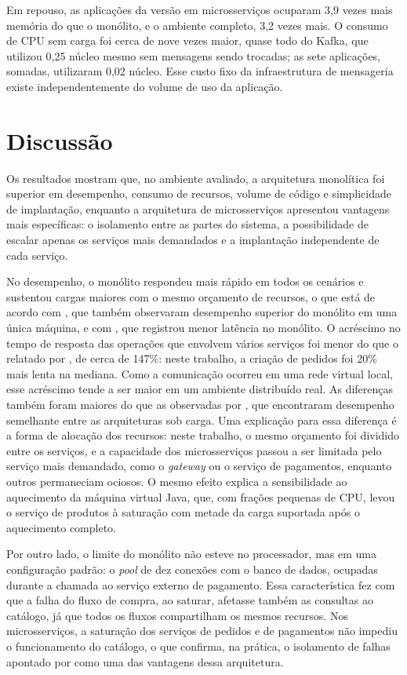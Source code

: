 Em repouso, as aplicações da versão em microsserviços ocuparam 3,9 vezes mais memória do que o
monólito, e o ambiente completo, 3,2 vezes mais. O consumo de CPU sem carga foi cerca de nove
vezes maior,
quase todo do Kafka, que utilizou 0,25 núcleo mesmo sem mensagens sendo trocadas; as sete
aplicações, somadas, utilizaram 0,02 núcleo. Esse custo fixo da infraestrutura de mensageria
existe independentemente do volume de uso da aplicação.

\section{Discussão}

Os resultados mostram que, no ambiente avaliado, a arquitetura monolítica foi superior em
desempenho, consumo de recursos, volume de código e simplicidade de implantação, enquanto a
arquitetura de microsserviços apresentou vantagens mais específicas: o isolamento entre as
partes do sistema, a possibilidade de escalar apenas os serviços mais demandados e a
implantação independente de cada serviço.

No desempenho, o monólito respondeu mais rápido em todos os cenários e sustentou cargas maiores
com o mesmo orçamento de recursos, o que está de acordo com , que
também observaram desempenho superior do monólito em uma única máquina, e com
, que registrou menor latência no monólito. O acréscimo no tempo de
resposta das operações que envolvem vários serviços foi menor do que o relatado por
, de cerca de 147\%: neste trabalho, a criação de pedidos foi 20\% mais lenta
na mediana. Como a comunicação ocorreu em uma rede virtual local, esse acréscimo tende a ser
maior em um ambiente distribuído real. As diferenças também foram maiores do que as observadas
por , que encontraram desempenho semelhante entre as arquiteturas sob
carga. Uma explicação para essa diferença é a forma de alocação dos recursos: neste trabalho, o
mesmo orçamento foi dividido entre os serviços, e a capacidade dos microsserviços passou a ser
limitada pelo serviço mais demandado, como o \textit{gateway} ou o serviço de pagamentos,
enquanto outros permaneciam ociosos. O mesmo efeito explica a sensibilidade ao aquecimento da
máquina virtual Java, que, com frações pequenas de CPU, levou o serviço de produtos à saturação
com metade da carga suportada após o aquecimento completo.

Por outro lado, o limite do monólito não esteve no processador, mas em uma configuração padrão:
o \textit{pool} de dez conexões com o banco de dados, ocupadas durante a chamada ao serviço
externo de pagamento. Essa característica fez com que a falha do fluxo de compra, ao saturar,
afetasse também as consultas ao catálogo, já que todos os fluxos compartilham os mesmos
recursos. Nos microsserviços, a saturação dos serviços de pedidos e de pagamentos não impediu o
funcionamento do catálogo, o que confirma, na prática, o isolamento de falhas apontado por
 como uma das vantagens dessa arquitetura.

